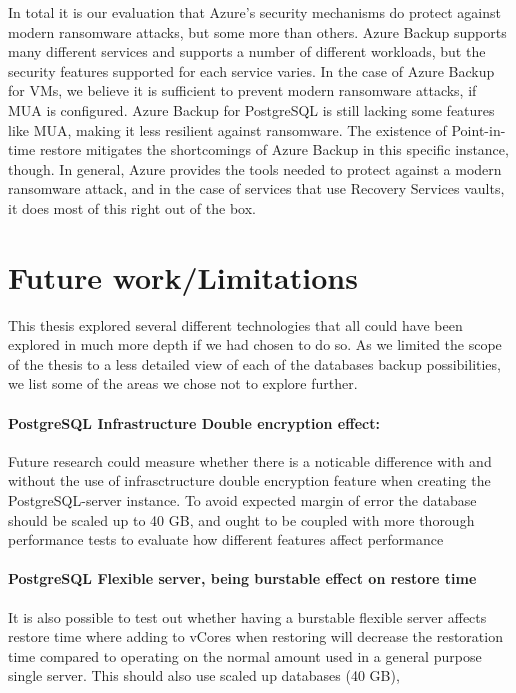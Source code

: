 In total it is our evaluation that Azure's security mechanisms do protect against modern ransomware attacks, but some more than others. Azure Backup supports many different services and supports a number of different workloads, but the security features supported for each service varies. In the case of Azure Backup for VMs, we believe it is sufficient to prevent modern ransomware attacks, if MUA is configured. Azure Backup for PostgreSQL is still lacking some features like MUA, making it less resilient against ransomware.  The existence of Point-in-time restore mitigates the shortcomings of Azure Backup in this specific instance, though. In general, Azure provides the tools needed to protect against a modern ransomware attack, and in the case of services that use Recovery Services vaults, it does most of this right out of the box. 

\section{Future work/Limitations}
This thesis explored several different technologies that all could have been explored in much more depth if we had chosen to do so. As we limited the scope of the thesis to a less detailed view of each of the databases backup possibilities, we list some of the areas we chose not to explore further.    

\paragraph{PostgreSQL Infrastructure Double encryption effect:}
Future research could measure whether there is a noticable difference with and without the use of infrasctructure double encryption feature when creating the PostgreSQL-server instance. To avoid expected margin of error the database should be scaled up to 40 GB, and ought to be coupled with more thorough performance tests to evaluate how different features affect performance

\paragraph{PostgreSQL Flexible server, being burstable effect on restore time}
It is also possible to test out whether having a burstable flexible server affects restore time where adding to vCores when restoring will decrease the restoration time compared to operating on the normal amount used in a general purpose single server. This should also use scaled up databases (40 GB), 

